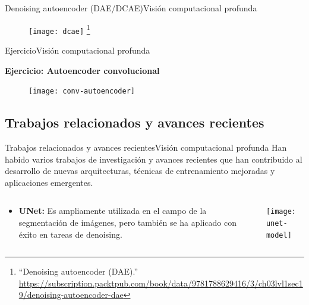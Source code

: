 \documentclass[10pt,border=3pt,tikz]{beamer}
\begin{document}
    \begin{frame}{Denoising autoencoder (DAE/DCAE)}{Visión computacional profunda}
        \begin{figure}
            \centering
            \texttt{[image: dcae]}
            \let\thefootnote\relax\footnote{{\tiny “Denoising autoencoder (DAE).” \url{https://subscription.packtpub.com/book/data/9781788629416/3/ch03lvl1sec19/denoising-autoencoder-dae}}}
        \end{figure}
    \end{frame}
    
    \begin{frame}{Ejercicio}{Visión computacional profunda}
        \begin{center}
            {\Large \textbf{Ejercicio: Autoencoder convolucional}}
        \end{center}
        \begin{figure}
            \centering
            \texttt{[image: conv-autoencoder]}
        \end{figure}
    \end{frame}
    
    \subsection{Trabajos relacionados y avances recientes}
    
    \begin{frame}{Trabajos relacionados y avances recientes}{Visión computacional profunda}
        Han habido varios trabajos de investigación y avances recientes que han contribuido al desarrollo de nuevas arquitecturas, técnicas de entrenamiento mejoradas y aplicaciones emergentes.
        \begin{columns}
            \begin{column}{0.55\textwidth}
                \begin{itemize}
                    \item \textbf{UNet:} Es ampliamente utilizada en el campo de la segmentación de imágenes, pero también se ha aplicado con éxito en tareas de denoising.
                \end{itemize}
            \end{column}
            \begin{column}{0.4\textwidth}
                \begin{center}
                    \texttt{[image: unet-model]}
                \end{center}
            \end{column}
        \end{columns}
    \end{frame}
    
\end{document}
